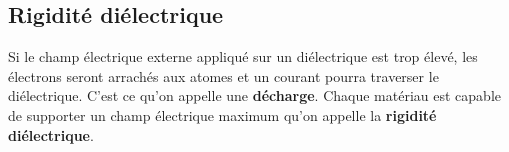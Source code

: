 \subsection*{Rigidité diélectrique}

Si le champ électrique externe appliqué sur un diélectrique est trop élevé, les
électrons seront arrachés aux atomes et un courant pourra traverser le
diélectrique. C'est ce qu'on appelle une \textbf{décharge}. Chaque matériau est
capable de supporter un champ électrique maximum qu'on appelle la
\textbf{rigidité diélectrique}.

